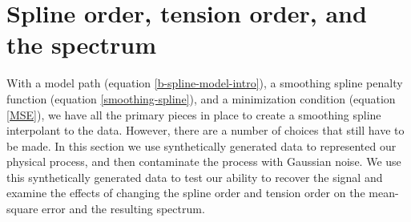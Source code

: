 \documentclass[10pt,journal]{IEEEtran}
\begin{document}


%
\section{Spline order, tension order, and the spectrum} \label{sec:optimal_parameter}
%

With a model path (equation \ref{b-spline-model-intro}), a smoothing spline penalty function (equation \ref{smoothing-spline}), and a minimization condition (equation \ref{MSE}), we have all the primary pieces in place to create a smoothing spline interpolant to the data. However, there are a number of choices that still have to be made. In this section we use synthetically generated data to represented our physical process, and then contaminate the process with Gaussian noise. We use this synthetically generated data to test our ability to recover the signal and examine the effects of changing the spline order and tension order on the mean-square error and the resulting spectrum.
\end{document}
